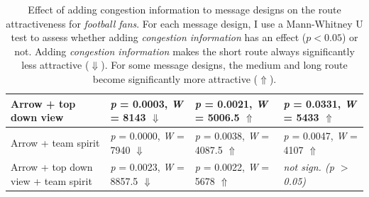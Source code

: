 \begin{table}[H]
\begin{footnotesize}
\begin{tabular}{|p{7cm}|p{2cm}|p{2cm}|p{2cm}|}
  Arrow +  top down view                  & \textit{p} = 0.0003, \newline \textit{W} = 8143 $\Downarrow$      & \textit{p} = 0.0021, \newline \textit{W} = 5006.5 $\Uparrow$ & \textit{p} = 0.0331, \newline \textit{W} = 5433 $\Uparrow$  \\ \hline
  Arrow +  team spirit                  & \textit{p} = 0.0000, \newline \textit{W} = 7940 $\Downarrow$        & \textit{p} = 0.0038, \newline \textit{W} = 4087.5  $\Uparrow$  & \textit{p} = 0.0047, \newline \textit{W} = 4107 $\Uparrow$  \\ \hline
  Arrow +  top down view +  team spirit & \textit{p} = 0.0023, \newline \textit{W} = 8857.5 $\Downarrow$      & \textit{p} = 0.0022, \newline \textit{W} = 5678 $\Uparrow$   &                                                                             \textit{not sign. \newline (\textit{p} $>$ 0.05)} \\ \hline
\end{tabular}
\end{footnotesize}
\caption[Effect of adding congestion information to message designs (football fans)]{
Effect of adding congestion information to message designs on the route attractiveness for \textit{football fans}.
For each message design, I use a Mann-Whitney U test to assess whether adding \textit{congestion information} has an effect ($p<0.05$) or not.
Adding \textit{congestion information}  makes the short route always significantly less attractive ($\Downarrow$). For some message designs, the medium and long route become significantly more attractive ($\Uparrow$).}
\label{tab4}
\end{table}



